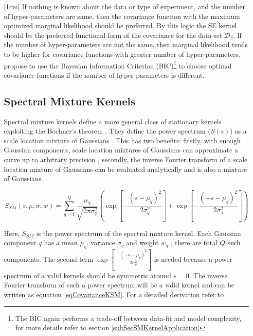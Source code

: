 [1cm]
If nothing is known about the data or type of experiment, and the number of hyper-parameters are same, then the covariance function with the maximum optimized marginal likelihood should be preferred. By this logic the SE kernel should be the preferred functional form of the covariance for the data-set $\mathcal{D}_{2}$. If the number of hyper-parameters are not the same, then marginal likelihood tends to be higher for covariance functions with greater number of hyper-parameters. \cite{duvenaud-thesis-2014, lloyd2014automatic} propose to use the Bayesian Information Criterion (BIC)\footnote{The BIC again performs a trade-off between data-fit and model complexity, for more details refer to section \ref{subSecSMKernelApplication}} to choose optimal covariance functions if the number of hyper-parameters is different. 

\subsection{Spectral Mixture Kernels}\label{subSecSMKernel}
Spectral mixture kernels define a more general class of stationary kernels exploiting the Bochner's theorem \cite{bochner1959lectures}. They define the power spectrum ($S(s)$) as a scale location mixture of Gaussians \cite{wilson2013gaussian}. This has two benefits: firstly, with enough Gaussian components, scale location mixtures of Gaussians can approximate a curve up to arbitrary precision \cite{kostantinos2000gaussian, bishop2006pattern}, secondly, the inverse Fourier transform of a scale location mixture of Gaussians can be evaluated analytically and is also a mixture of Gaussians.

\begin{equation}\label{eqPowerSpectrumSSM}
    S_{SM}(s, \mu, \sigma, w) = \sum_{q=1}^{Q} \frac{w_{q}}{\sqrt{2\pi\sigma_{q}^2}}
\left ( \exp\left [ {-\frac{{(s-\mu_{q})^2}}{2\sigma_{q}^{2}}} \right ] + \exp\left [ {-\frac{{(-s-\mu_{q})^2}}{2\sigma_{q}^{2}}} \right ] \right  )
\end{equation}

Here, $ S_{SM}$ is the power spectrum of the spectral mixture kernel. Each Gaussian  component $q$ has a mean $\mu_{q}$, variance $\sigma_{q}$ and weight $w_{q}$ , there are total $Q$ such components. The second term $\exp\left [ {-\frac{{(-s-\mu_{q})^2}}{2\sigma_{q}^{2}}} \right ]$ is needed because a power spectrum of a valid kernels should be symmetric around $s=0$. The inverse Fourier transform of such a power spectrum will be a valid kernel and can be written as equation \ref{eqCovarianceKSM}. For a detailed derivation refer to \cite{wilson2014thesis}.

